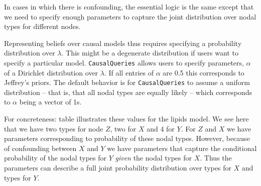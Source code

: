 \documentclass[
  11pt,
  article]{jss}
\begin{document}
In cases in which there is confounding, the essential logic is the same
except that we need to specify enough parameters to capture the joint
distribution over nodal types for different nodes.

Representing beliefs over causal models thus requires specifying a
probability distribution over \(\lambda\). This might be a degenerate
distribution if users want to specify a particular model.
\texttt{CausalQueries} allows users to specify parameters, \(\alpha\) of
a Dirichlet distribution over \(\lambda\). If all entries of \(\alpha\)
are 0.5 this corresponds to Jeffrey's priors. The default behavior is
for \texttt{CausalQueries} to assume a uniform distribution -- that is,
that all nodal types are equally likely -- which corresponds to
\(\alpha\) being a vector of 1s.

For concreteness: table \citet{tab:lipidspar} illustrates these values
for the lipids model. We see here that we have two types for node \(Z\),
two for \(X\) and 4 for \(Y\). For \(Z\) and \(X\) we have parameters
corresponding to probability of these nodal types. However, because of
confounding between \(X\) and \(Y\) we have parameters that capture the
conditional probability of the nodal types for \(Y\) \emph{given} the
nodal types for \(X\). Thus the parameters can describe a full joint
probability distribution over types for \(X\) and types for \(Y\).
\end{document}
